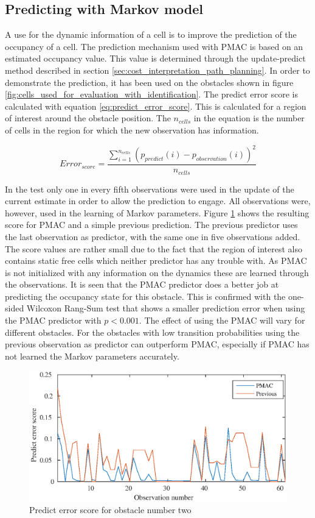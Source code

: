 
\subsection{Predicting with Markov model}

A use for the dynamic information of a cell is to improve the prediction of the occupancy of a cell. The prediction mechanism used with PMAC is based on an estimated occupancy value. This value is determined through the update-predict method described in section \vref{sec:cost_interpretation_path_planning}. 
In order to demonstrate the prediction, it has been used on the obstacles shown in figure \ref{fig:cells_used_for_evaluation_with_identification}. The predict error score is calculated with equation \ref{eq:predict_error_score}. This is calculated for a region of interest around the obstacle position. The $n_{cells}$  in the equation is the number of cells in the region for which the new observation has information.

\begin{equation}
	Error_{score} = \frac{\sum\limits_{i=1}^{n_{cells}} (p_{predict}(i)-p_{observation}(i))^2}{n_{cells}}
	\label{eq:predict_error_score}
\end{equation} 

In the test only one in every fifth observations were used in the update of the current estimate in order to allow the prediction to engage. All observations were, however, used in the learning of Markov parameters. Figure \ref{fig:markov_predict_obst_2} shows the resulting score for PMAC and a simple previous prediction. The previous predictor uses the last observation as predictor, with the same one in five observations added. The score values are rather small due to the fact that the region of interest also contains static free cells which neither predictor has any trouble with. As PMAC is not initialized with any information on the dynamics these are learned through the observations. 
It is seen that the PMAC predictor does a better job at predicting the occupancy state for this obstacle. 
This is confirmed with the one-sided Wilcoxon Rang-Sum test that shows a smaller prediction error when using the PMAC predictor with $p<0.001$.
The effect of using the PMAC will vary for different obstacles. For the obstacles with low transition probabilities using the previous observation as predictor can outperform PMAC, especially if PMAC has not learned the Markov parameters accurately. 

\begin{figure}[htbp]
	\centering
	\includegraphics[scale=1]{chapters/evaluation/figures/markov_predict_figs/obstacle2_low.eps}
	\caption{Predict error score for obstacle number two}
	\label{fig:markov_predict_obst_2}
\end{figure}